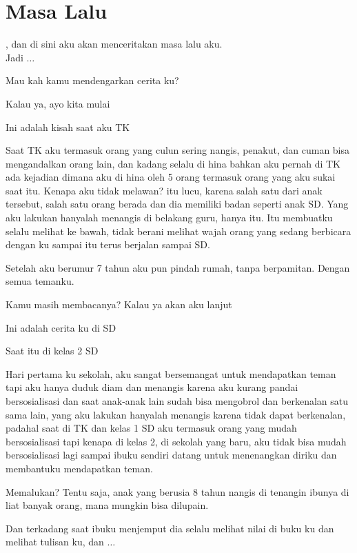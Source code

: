\chapter*{Masa Lalu}
, dan di sini aku akan menceritakan masa lalu aku. \\


Jadi $\dots$

Mau kah kamu mendengarkan cerita ku?


Kalau ya, ayo kita mulai


Ini adalah kisah saat aku TK


Saat TK aku termasuk orang yang culun sering nangis, penakut, dan cuman bisa mengandalkan orang lain, dan kadang selalu di hina bahkan aku pernah di TK ada kejadian dimana aku di hina oleh 5 orang termasuk orang yang aku sukai saat itu. Kenapa aku tidak melawan? itu lucu, karena salah satu dari anak tersebut, salah satu orang berada dan dia memiliki badan seperti anak SD. Yang aku lakukan hanyalah menangis di belakang guru, hanya itu. Itu membuatku selalu melihat ke bawah, tidak berani melihat wajah orang yang sedang berbicara dengan ku sampai itu terus berjalan sampai SD.


Setelah aku berumur 7 tahun aku pun pindah rumah, tanpa berpamitan. Dengan semua temanku.


Kamu masih membacanya? Kalau ya akan aku lanjut


Ini adalah cerita ku di SD


Saat itu di kelas 2 SD


Hari pertama ku sekolah, aku sangat bersemangat untuk mendapatkan teman tapi aku hanya duduk diam dan menangis karena aku kurang pandai bersosialisasi dan saat anak-anak lain sudah bisa mengobrol dan berkenalan satu sama lain, yang aku lakukan hanyalah menangis karena tidak dapat berkenalan, padahal saat di TK dan kelas 1 SD aku termasuk orang yang mudah bersosialisasi tapi kenapa di kelas 2, di sekolah yang baru, aku tidak bisa mudah bersosialisasi lagi sampai ibuku sendiri datang untuk menenangkan diriku dan membantuku mendapatkan teman.


Memalukan? Tentu saja, anak yang berusia 8 tahun nangis di tenangin ibunya di liat banyak orang, mana mungkin bisa dilupain.


Dan terkadang saat ibuku menjemput dia selalu melihat nilai di buku ku dan melihat tulisan ku, dan $\dots$


